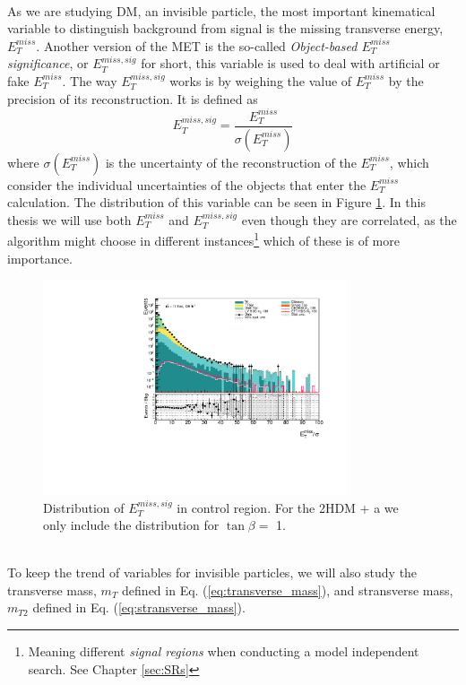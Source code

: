 \documentclass[12pt, a4paper]{book}
\begin{document}
\\As we are studying DM, an invisible particle, the most important kinematical variable to distinguish background from signal is the missing transverse energy, $E_T^{miss}$.
Another version of the MET is the so-called \textit{Object-based $E_T^{miss}$ significance}, or $E_T^{miss,sig}$ for short, this variable is used to deal with artificial or fake $E_T^{miss}$. The way $E_T^{miss,sig}$ works is by 
weighing the value of $E_T^{miss}$ by the precision of its reconstruction. It is defined as
\begin{equation}\label{eq:METsig}
    E_T^{miss,sig} = \frac{E_T^{miss}}{\sigma(E_T^{miss})}
\end{equation}
where $\sigma(E_T^{miss})$ is the uncertainty of the reconstruction of the $E_T^{miss}$, which consider the individual uncertainties of the objects that enter the $E_T^{miss}$ calculation. The distribution of this variable can be seen in Figure \ref{fig:met_sig_dist}. 
In this thesis we will use both $E_T^{miss}$ and $E_T^{miss,sig}$ even though they are correlated, as the algorithm might choose in different instances\footnote{Meaning different \textit{signal regions} when conducting a model independent search. See Chapter \ref{sec:SRs}} 
which of these is of more importance.\\
\begin{figure}[!ht]
    \centering
        \includegraphics[width=0.8\textwidth]{met_sig.pdf}
    \caption{Distribution of $E_{T}^{miss,sig}$ in control region.  For the 2HDM + a we only include the distribution for $\tan\beta=$ 1.}\label{fig:met_sig_dist}
\end{figure}
\\To keep the trend of variables for invisible particles, we will also study the transverse mass, $m_T$ defined in Eq. (\ref{eq:transverse_mass}), and stransverse mass, $m_{T2}$ defined in Eq. (\ref{eq:stransverse_mass}). 
\end{document}
